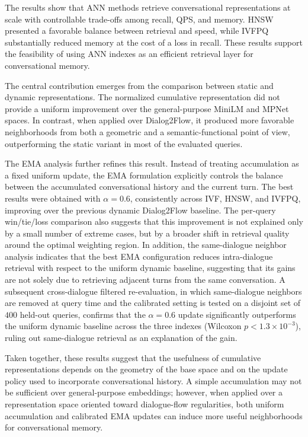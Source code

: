 \documentclass[runningheads]{llncs}
\begin{document}
The results show that ANN methods retrieve conversational representations at scale with controllable trade-offs among recall, QPS, and memory. HNSW presented a favorable balance between retrieval and speed, while IVFPQ substantially reduced memory at the cost of a loss in recall. These results support the feasibility of using ANN indexes as an efficient retrieval layer for conversational memory.

The central contribution emerges from the comparison between static and dynamic representations. The normalized cumulative representation did not provide a uniform improvement over the general-purpose MiniLM and MPNet spaces. In contrast, when applied over Dialog2Flow, it produced more favorable neighborhoods from both a geometric and a semantic-functional point of view, outperforming the static variant in most of the evaluated queries.

The EMA analysis further refines this result. Instead of treating accumulation as a fixed uniform update, the EMA formulation explicitly controls the balance between the accumulated conversational history and the current turn. The best results were obtained with $\alpha=0.6$, consistently across IVF, HNSW, and IVFPQ, improving over the previous dynamic Dialog2Flow baseline. The per-query win/tie/loss comparison also suggests that this improvement is not explained only by a small number of extreme cases, but by a broader shift in retrieval quality around the optimal weighting region. In addition, the same-dialogue neighbor analysis indicates that the best EMA configuration reduces intra-dialogue retrieval with respect to the uniform dynamic baseline, suggesting that its gains are not solely due to retrieving adjacent turns from the same conversation. A subsequent cross-dialogue filtered re-evaluation, in which same-dialogue neighbors are removed at query time and the calibrated setting is tested on a disjoint set of $400$ held-out queries, confirms that the $\alpha=0.6$ update significantly outperforms the uniform dynamic baseline across the three indexes (Wilcoxon $p<1.3\times10^{-3}$), ruling out same-dialogue retrieval as an explanation of the gain.

Taken together, these results suggest that the usefulness of cumulative representations depends on the geometry of the base space and on the update policy used to incorporate conversational history. A simple accumulation may not be sufficient over general-purpose embeddings; however, when applied over a representation space oriented toward dialogue-flow regularities, both uniform accumulation and calibrated EMA updates can induce more useful neighborhoods for conversational memory.
\end{document}
